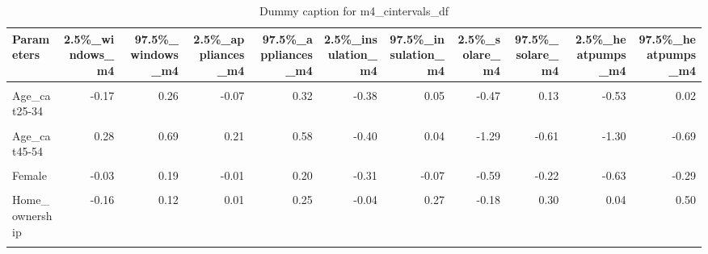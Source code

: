 \begin{table}
\centering
\caption{Dummy caption for m4_cintervals_df}
\centering
\fontsize{10}{12}\selectfont
\begin{tabular}[t]{lrrrrrrrrrr}
\toprule
Parameters & 2.5\%\_windows\_m4 & 97.5\%\_windows\_m4 & 2.5\%\_appliances\_m4 & 97.5\%\_appliances\_m4 & 2.5\%\_insulation\_m4 & 97.5\%\_insulation\_m4 & 2.5\%\_solare\_m4 & 97.5\%\_solare\_m4 & 2.5\%\_heatpumps\_m4 & 97.5\%\_heatpumps\_m4\\
\midrule
\cellcolor{gray!10}{(Intercept)} & \cellcolor{gray!10}{-4.13} & \cellcolor{gray!10}{-2.19} & \cellcolor{gray!10}{-0.65} & \cellcolor{gray!10}{0.55} & \cellcolor{gray!10}{-3.38} & \cellcolor{gray!10}{-1.59} & \cellcolor{gray!10}{-3.65} & \cellcolor{gray!10}{-0.59} & \cellcolor{gray!10}{-4.25} & \cellcolor{gray!10}{-1.46}\\
Age\_cat25-34 & -0.17 & 0.26 & -0.07 & 0.32 & -0.38 & 0.05 & -0.47 & 0.13 & -0.53 & 0.02\\
\cellcolor{gray!10}{Age\_cat35-44} & \cellcolor{gray!10}{0.05} & \cellcolor{gray!10}{0.46} & \cellcolor{gray!10}{0.03} & \cellcolor{gray!10}{0.41} & \cellcolor{gray!10}{-0.47} & \cellcolor{gray!10}{-0.03} & \cellcolor{gray!10}{-0.73} & \cellcolor{gray!10}{-0.12} & \cellcolor{gray!10}{-1.21} & \cellcolor{gray!10}{-0.58}\\
Age\_cat45-54 & 0.28 & 0.69 & 0.21 & 0.58 & -0.40 & 0.04 & -1.29 & -0.61 & -1.30 & -0.69\\
\cellcolor{gray!10}{Age\_cat55+} & \cellcolor{gray!10}{0.79} & \cellcolor{gray!10}{1.14} & \cellcolor{gray!10}{0.38} & \cellcolor{gray!10}{0.71} & \cellcolor{gray!10}{0.00} & \cellcolor{gray!10}{0.36} & \cellcolor{gray!10}{-0.93} & \cellcolor{gray!10}{-0.40} & \cellcolor{gray!10}{-1.02} & \cellcolor{gray!10}{-0.52}\\
Female & -0.03 & 0.19 & -0.01 & 0.20 & -0.31 & -0.07 & -0.59 & -0.22 & -0.63 & -0.29\\
\cellcolor{gray!10}{Higher\_edu} & \cellcolor{gray!10}{0.02} & \cellcolor{gray!10}{0.24} & \cellcolor{gray!10}{-0.08} & \cellcolor{gray!10}{0.13} & \cellcolor{gray!10}{0.07} & \cellcolor{gray!10}{0.33} & \cellcolor{gray!10}{0.09} & \cellcolor{gray!10}{0.48} & \cellcolor{gray!10}{-0.05} & \cellcolor{gray!10}{0.32}\\
Home\_ownership & -0.16 & 0.12 & 0.01 & 0.25 & -0.04 & 0.27 & -0.18 & 0.30 & 0.04 & 0.50\\
\cellcolor{gray!10}{Dwelling\_house} & \cellcolor{gray!10}{-0.12} & \cellcolor{gray!10}{0.17} & \cellcolor{gray!10}{-0.02} & \cellcolor{gray!10}{0.23} & \cellcolor{gray!10}{0.00} & \cellcolor{gray!10}{0.30} & \cellcolor{gray!10}{-0.42} & \cellcolor{gray!10}{0.05} & \cellcolor{gray!10}{-0.35} & \cellcolor{gray!10}{0.09}\\

\end{tabular}
\end{table}
